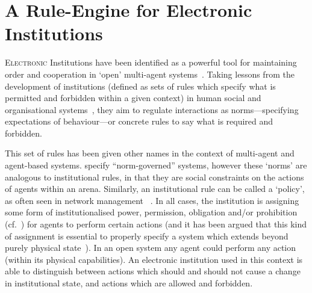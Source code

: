 \acresetall
\chapter{A Rule-Engine for Electronic Institutions}\label{ch:droolseinst}

\lettrine[lines=3]{E}{lectronic} Institutions have been identified as a powerful
tool for maintaining order and cooperation in `open' multi-agent
systems~\citep{Esteva2001,Artikis2009}. Taking lessons from the development of
institutions (defined as sets of rules which specify what is permitted and
forbidden within a given context) in human social and
organisational systems~\citep{Ostrom1990,North1990}, they aim to regulate interactions as norms---specifying
expectations of behaviour---or concrete rules to say what is required and
forbidden.

This set of rules has been given other names in the context of multi-agent and
agent-based systems. \citet{Artikis2009} specify ``norm-governed'' systems,
however these `norms' are analogous to institutional rules, in that they are
social constraints on the actions of agents within an arena. Similarly, an
institutional rule can be called a `policy', as often seen in network
management ~\citep{Sloman1999}. In all cases, the institution is assigning
some form of institutionalised power, permission, obligation and/or
prohibition (cf.~\citet{Jones1996}) for agents to perform certain actions (and it has
been argued that this kind of assignment is essential to properly specify a system which extends beyond purely physical state~\citep{Artikis2009a}).
In an open system any agent could perform any action (within its physical
capabilities). An electronic institution used in this context is able to
distinguish between actions which should and should not cause a change in
institutional state, and actions which are allowed and forbidden.



